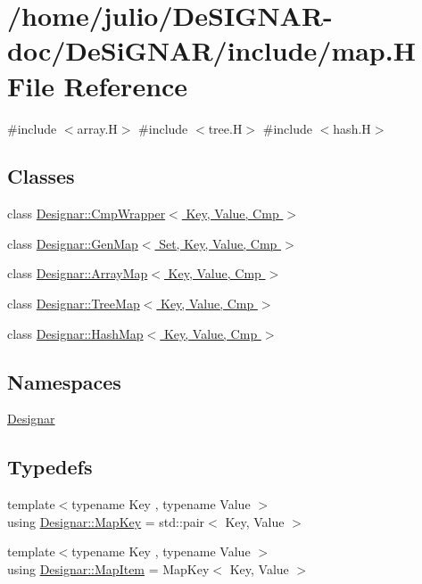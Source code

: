 \hypertarget{map_8_h}{}\section{/home/julio/\+De\+S\+I\+G\+N\+A\+R-\/doc/\+De\+Si\+G\+N\+A\+R/include/map.H File Reference}
\label{map_8_h}
{\ttfamily \#include $<$array.\+H$>$}\newline
{\ttfamily \#include $<$tree.\+H$>$}\newline
{\ttfamily \#include $<$hash.\+H$>$}\newline
\subsection*{Classes}
\begin{DoxyCompactItemize}
\item 
class \hyperlink{class_designar_1_1_cmp_wrapper}{Designar\+::\+Cmp\+Wrapper$<$ Key, Value, Cmp $>$}
\item 
class \hyperlink{class_designar_1_1_gen_map}{Designar\+::\+Gen\+Map$<$ Set, Key, Value, Cmp $>$}
\item 
class \hyperlink{class_designar_1_1_array_map}{Designar\+::\+Array\+Map$<$ Key, Value, Cmp $>$}
\item 
class \hyperlink{class_designar_1_1_tree_map}{Designar\+::\+Tree\+Map$<$ Key, Value, Cmp $>$}
\item 
class \hyperlink{class_designar_1_1_hash_map}{Designar\+::\+Hash\+Map$<$ Key, Value, Cmp $>$}
\end{DoxyCompactItemize}
\subsection*{Namespaces}
\begin{DoxyCompactItemize}
\item 
 \hyperlink{namespace_designar}{Designar}
\end{DoxyCompactItemize}
\subsection*{Typedefs}
\begin{DoxyCompactItemize}
\item 
{\footnotesize template$<$typename Key , typename Value $>$ }\\using \hyperlink{namespace_designar_a7394b1b25278abf7211e77b91eb5204f}{Designar\+::\+Map\+Key} = std\+::pair$<$ Key, Value $>$
\item 
{\footnotesize template$<$typename Key , typename Value $>$ }\\using \hyperlink{namespace_designar_abc6ea5602461a15100a645d1f0e5cbcb}{Designar\+::\+Map\+Item} = Map\+Key$<$ Key, Value $>$
\end{DoxyCompactItemize}

